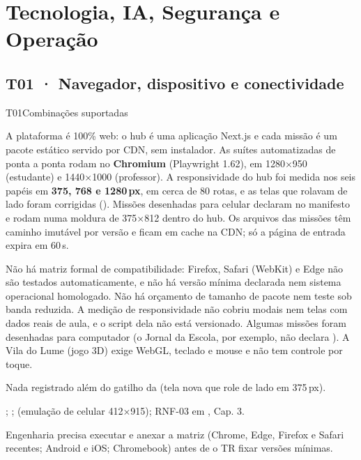 \chapter{Tecnologia, IA, Segurança e Operação}
\label{cap:tecnologia}

\section{T01 · Navegador, dispositivo e conectividade}
\label{sec:t01}

\begin{resposta}{T01}{Combinações suportadas}{\parcial}
\begin{campos}
  \item[Hoje] A plataforma é 100\% web: o hub é uma aplicação Next.js e cada
    missão é um pacote estático servido por CDN, sem instalador. As suítes
    automatizadas de ponta a ponta rodam no \textbf{Chromium} (Playwright
    1.62), em 1280$\times$950 (estudante) e 1440$\times$1000 (professor). A
    responsividade do hub foi medida nos seis papéis em \textbf{375, 768 e
    1280\,px}, em cerca de 80 rotas, e as telas que rolavam de lado foram
    corrigidas (). Missões desenhadas para celular declaram
     no manifesto e rodam numa moldura de 375$\times$812 dentro do
    hub. Os arquivos das missões têm caminho imutável por versão e ficam em
    cache na CDN; só a página de entrada expira em 60\,s.
  \item[Limitações] Não há matriz formal de compatibilidade: Firefox, Safari
    (WebKit) e Edge não são testados automaticamente, e não há versão mínima
    declarada nem sistema operacional homologado. Não há orçamento de tamanho
    de pacote nem teste sob banda reduzida. A medição de responsividade não
    cobriu modais nem telas com dados reais de aula, e o script dela não está
    versionado. Algumas missões foram desenhadas para computador (o Jornal da
    Escola, por exemplo, não declara ). A Vila do Lume (jogo 3D)
    exige WebGL, teclado e mouse e não tem controle por toque.
  \item[Planejado] Nada registrado além do gatilho da  (tela nova
    que role de lado em 375\,px).
  \item[Evidência] ; ;
     (emulação de
    celular 412$\times$915); RNF-03 em , Cap. 3.
  \item[Lacuna] Engenharia precisa executar e anexar a matriz (Chrome, Edge,
    Firefox e Safari recentes; Android e iOS; Chromebook) antes de o TR fixar
    versões mínimas.
\end{campos}
\end{resposta}

